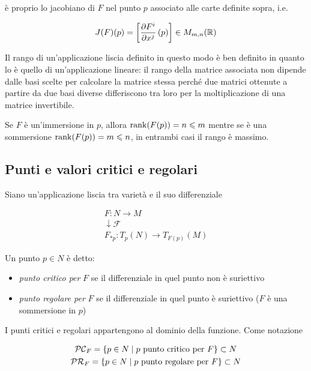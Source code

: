 è proprio lo jacobiano di $ F $ nel punto $ p $ associato alle carte definite sopra, i.e.

\begin{equation}
	J(F)(p) = \left[ \pdv{F^{i}}{x^{j}} \, (p) \right] \in M_{m,n}(\mathbb{R})
\end{equation}

Il rango di un'applicazione liscia definito in questo modo è ben definito in quanto lo è quello di un'applicazione lineare: il rango della matrice associata non dipende dalle basi scelte per calcolare la matrice stessa perché due matrici ottenute a partire da due basi diverse differiscono tra loro per la moltiplicazione di una matrice invertibile.

\begin{remark}
	Se $ F $ è un'immersione in $ p $, allora $ \rank(F(p)) = n \leqslant m $ mentre se è una sommersione $ \rank(F(p)) = m \leqslant n $, in entrambi casi il rango è massimo.
\end{remark}

\subsection{Punti e valori critici e regolari}

Siano un'applicazione liscia tra varietà e il suo differenziale

\begin{gather}
	F : N \to M\\
	\downarrow \mathcal{F} \nonumber\\
	F_{*p} : T_{p}(N) \to T_{F(p)}(M)
\end{gather}

Un punto $ p \in N $ è detto:

\begin{itemize}
	\item \textit{punto critico per} $ F $ se il differenziale in quel punto non è suriettivo
	
	\item \textit{punto regolare per} $ F $ se il differenziale in quel punto è suriettivo ($ F $ è una sommersione in $ p $)
\end{itemize}

I punti critici e regolari appartengono al dominio della funzione. Come notazione

\begin{gather}
	\mathcal{PC}_{F} = \{ p \in N \mid p \text{ punto critico per } F \} \subset N\\
	\mathcal{PR}_{F} = \{ p \in N \mid p \text{ punto regolare per } F \} \subset N
\end{gather}


